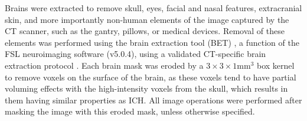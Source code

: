 \documentclass[12pt]{report}
\begin{document}
\begin{refsection}
Brains were extracted to remove skull, eyes, facial and nasal features, extracranial skin, and more importantly non-human elements of the image captured by the CT scanner, such as the gantry, pillows, or medical devices.  Removal of these elements was performed using the brain extraction tool (BET) \citep{smith_fast_2002}, a function of the FSL \citep{jenkinson_fsl_2012} neuroimaging software (v5.0.4), using a validated CT-specific brain extraction protocol \citep{muschelli_iii_validated_2015}.  Each brain mask was eroded by a $3\times3\times1$mm$^{3}$ box kernel to remove voxels on the surface of the brain, as these voxels tend to have partial voluming effects with the high-intensity voxels from the skull, which results in them having similar properties as ICH.  All image operations were performed after masking the image with this eroded mask, unless otherwise specified.



\end{refsection}
\end{document}

